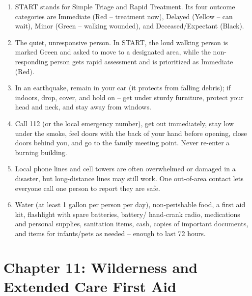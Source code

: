 \begin{enumerate}[leftmargin=*]
\item START stands for Simple Triage and Rapid Treatment. Its four outcome categories are Immediate (Red -- treatment now), Delayed (Yellow -- can wait), Minor (Green -- walking wounded), and Deceased/Expectant (Black).
\item The quiet, unresponsive person. In START, the loud walking person is marked Green and asked to move to a designated area, while the non-responding person gets rapid assessment and is prioritized as Immediate (Red).
\item In an earthquake, remain in your car (it protects from falling debris); if indoors, drop, cover, and hold on -- get under sturdy furniture, protect your head and neck, and stay away from windows.
\item Call 112 (or the local emergency number), get out immediately, stay low under the smoke, feel doors with the back of your hand before opening, close doors behind you, and go to the family meeting point. Never re-enter a burning building.
\item Local phone lines and cell towers are often overwhelmed or damaged in a disaster, but long-distance lines may still work. One out-of-area contact lets everyone call one person to report they are safe.
\item Water (at least 1 gallon per person per day), non-perishable food, a first aid kit, flashlight with spare batteries, battery/ hand-crank radio, medications and personal supplies, sanitation items, cash, copies of important documents, and items for infants/pets as needed -- enough to last 72 hours.
\end{enumerate}

\section*{Chapter 11: Wilderness and Extended Care First Aid}


